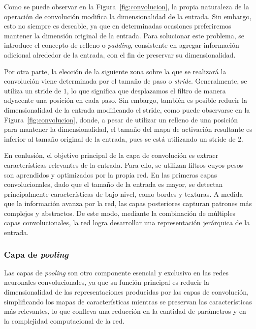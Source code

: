 Como se puede observar en la Figura~\ref{fig:convolucion}, la propia naturaleza de la operación de convolución modifica la dimensionalidad de la entrada. Sin embargo, esto no siempre es deseable, ya que en determinadas ocasiones preferiremos mantener la dimensión original de la entrada. Para solucionar este problema, se introduce el concepto de relleno o \emph{padding}, consistente en agregar información adicional alrededor de la entrada, con el fin de preservar su dimensionalidad.

Por otra parte, la elección de la siguiente zona sobre la que se realizará la convolución viene determinada por el tamaño de paso o \emph{stride}. Generalmente, se utiliza un stride de $1$, lo que significa que desplazamos el filtro de manera adyacente una posición en cada paso. Sin embargo, también es posible reducir la dimensionalidad de la entrada modificando el stride, como puede observarse en la Figura~\ref{fig:convolucion}, donde, a pesar de utilizar un relleno de una posición para mantener la dimensionalidad, el tamaño del mapa de activación resultante es inferior al tamaño original de la entrada, pues se está utilizando un stride de $2$.

En conlusión, el objetivo principal de la capa de convolución es extraer características relevantes de la entrada. Para ello, se utilizan filtros cuyos pesos son aprendidos y optimizados por la propia red. En las primeras capas convolucionales, dado que el tamaño de la entrada es mayor, se detectan principalmente características de bajo nivel, como bordes y texturas. A medida que la información avanza por la red, las capas posteriores capturan patrones más complejos y abstractos. De este modo, mediante la combinación de múltiples capas convolucionales, la red logra desarrollar una representación jerárquica de la entrada.

\subsubsection{Capa de \textit{pooling}}

Las capas de \textit{pooling} son otro componente esencial y exclusivo en las redes neuronales convolucionales, ya que su función principal es reducir la dimensionalidad de las representaciones producidas por las capas de convolución, simplificando los mapas de características mientras se preservan las características más relevantes, lo que conlleva una reducción en la cantidad de parámetros y en la complejidad computacional de la red.


